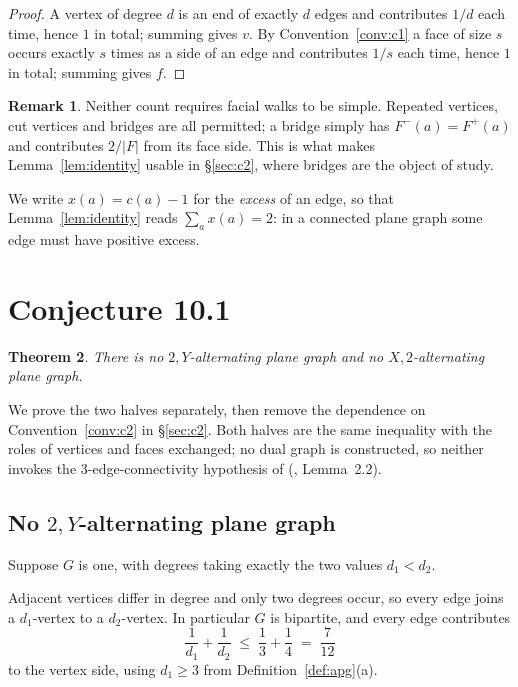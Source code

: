 \documentclass[11pt,a4paper]{amsart}
\theoremstyle{plain}
\newtheorem{theorem}{Theorem}[section]
\theoremstyle{definition}
\newtheorem{remark}[theorem]{Remark}
\begin{document}
\begin{proof}
A vertex of degree $d$ is an end of exactly $d$ edges and contributes $1/d$ each
time, hence $1$ in total; summing gives $v$. By Convention~\ref{conv:c1} a face
of size $s$ occurs exactly $s$ times as a side of an edge and contributes $1/s$
each time, hence $1$ in total; summing gives $f$.
\end{proof}

\begin{remark}
Neither count requires facial walks to be simple. Repeated vertices, cut
vertices and bridges are all permitted; a bridge simply has
$F^-(a) = F^+(a)$ and contributes $2/|F|$ from its face side. This is what makes
Lemma~\ref{lem:identity} usable in \S\ref{sec:c2}, where bridges are the object
of study.
\end{remark}

We write $x(a) = c(a) - 1$ for the \emph{excess} of an edge, so that
Lemma~\ref{lem:identity} reads $\sum_a x(a) = 2$: in a connected plane graph
some edge must have positive excess.

\section{Conjecture 10.1}\label{sec:101}

\begin{theorem}\label{thm:101}
There is no $2,Y$-alternating plane graph and no $X,2$-alternating plane graph.
\end{theorem}

We prove the two halves separately, then remove the dependence on
Convention~\ref{conv:c2} in \S\ref{sec:c2}. Both halves are the same inequality
with the roles of vertices and faces exchanged; no dual graph is constructed, so
neither invokes the $3$-edge-connectivity hypothesis of
(\cite{AHSSV2015}, Lemma~2.2).

\subsection{No $2,Y$-alternating plane graph}

Suppose $G$ is one, with degrees taking exactly the two values $d_1 < d_2$.

Adjacent vertices differ in degree and only two degrees occur, so every edge
joins a $d_1$-vertex to a $d_2$-vertex. In particular $G$ is bipartite, and
every edge contributes
\[
  \frac{1}{d_1} + \frac{1}{d_2} \;\le\; \frac13 + \frac14 \;=\; \frac{7}{12}
\]
to the vertex side, using $d_1 \ge 3$ from Definition~\ref{def:apg}(a).
\end{document}
